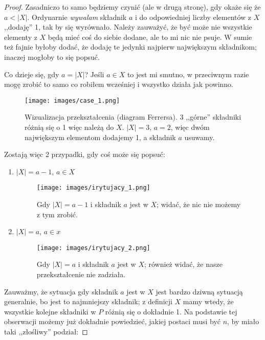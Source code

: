 \begin{proof}
        Zasadniczo to samo będziemy czynić (ale w drugą stronę), gdy okaże się że $a < |X| $. Ordynarnie \textit{wywalam} składnik $a$ i do odpowiedniej liczby elementów z $X$  ,,dodaję'' 1, tak by się wyrównało. Należy zauważyć, że być może nie wszystkie elementy z $X$ będą mieć coś do siebie dodane, ale to mi nic nie psuje. W sumie też fajnie byłoby dodać, że dodaję te jedynki najpierw największym składnikom; inaczej mogłoby to się popsuć. 

        Co dzieje się, gdy $a = |X|$? Jeśli $a \in X$ to jest mi smutno, w przeciwnym razie mogę zrobić to samo co robiłem wcześniej i wszystko działa jak powinno. 

        \begin{figure}[H]
            \centering
            \texttt{[image: images/case\_1.png]}
            \caption{Wizualizacja przekształcenia (diagram Ferrersa). 3 ,,górne'' składniki różnią się o 1 więc należą do $X$. $|X| = 3$, $a = 2$, więc dwóm największym elementom dodajemy 1, a składnik $a$ usuwamy.}
        \end{figure}

        Zostają więc 2 przypadki, gdy coś może się popsuć:
        \begin{enumerate}
            \item $|X| = a - 1$, $a \in X$
            \begin{figure}[H]
                \centering
                \texttt{[image: images/irytujacy\_1.png]}
                \caption{Gdy $|X| = a - 1$ i składnik $a$ jest w $X$; widać, że nic nie możemy z tym zrobić.}
            \end{figure}
        
            \item $|X| = a$, $a \in x$
            \begin{figure}[H]
                \centering
                \texttt{[image: images/irytujacy\_2.png]}
                \caption{Gdy $|X| = a$ i składnik $a$ jest w $X$; również widać, że nasze przekształcenie nie zadziała.}
            \end{figure}
        \end{enumerate}

        Zauważmy, że sytuacja gdy składnik $a$ jest w $X$ jest bardzo dziwną sytuacją generalnie, bo jest to najmniejszy składnik; z definicji $X$ mamy wtedy, że wszystkie kolejne składniki w $P$ różnią się o dokładnie 1. Na podstawie tej obserwacji możemy już dokładnie powiedzieć, jakiej postaci musi być $n$, by miało taki ,,złośliwy'' podział:
        

\end{proof}
